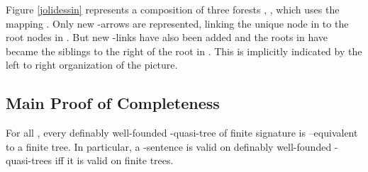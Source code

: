 \documentclass{LMCS}
\begin{document}
Figure \ref{jolidessin} represents a composition of three forests , ,  which uses the mapping . Only new -arrows are represented, linking the unique node in  to the root nodes in . But new -links have also been added and the roots in  have became the siblings to the right of the root in . This is implicitly indicated by the left to right organization of the picture. 






\subsection{Main Proof of Completeness}
\label{sectproof}


\begin{lem}
  For all , every definably well-founded -quasi-tree of
  finite signature is --equivalent to a finite tree. In particular,
  a -sentence is valid on definably well-founded -quasi-trees iff it is
  valid on finite trees.
\label{lemma3}
\end{lem}
\end{document}

